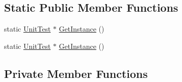 \subsection*{\-Static \-Public \-Member \-Functions}
\begin{DoxyCompactItemize}
\item 
static \hyperlink{classtesting_1_1UnitTest}{\-Unit\-Test} $\ast$ \hyperlink{classtesting_1_1UnitTest_ad200090b11104aca39f25043701886cf}{\-Get\-Instance} ()
\item 
static \hyperlink{classtesting_1_1UnitTest}{\-Unit\-Test} $\ast$ \hyperlink{classtesting_1_1UnitTest_a21109523171b0556353a7a54c88875d9}{\-Get\-Instance} ()
\end{DoxyCompactItemize}
\subsection*{\-Private \-Member \-Functions}
